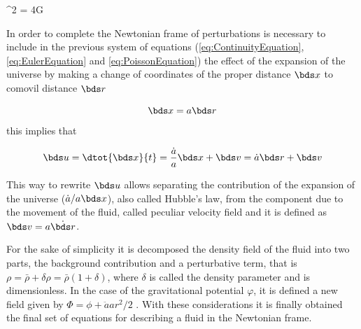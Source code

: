 { \nabla^2 \varphi = 4\pi G \rho }



In order to complete the Newtonian frame of perturbations is necessary to 
include in the previous system of equations (\ref{eq:ContinuityEquation}, 
\ref{eq:EulerEquation} and \ref{eq:PoissonEquation}) the effect of the 
expansion of the universe by making a change of coordinates of the proper
distance $\bds x$ to comovil distance $\bds r$



\[\bds x = a \bds r\]
this implies that



\[\bds u = \dtot{\bds x}{t} = 
\frac{\dot a}{a}\bds x + \bds v = \dot a \bds r + \bds v\]



This way to rewrite $\bds u$ allows separating the contribution of the 
expansion of the universe ($\dot a/a \bds x$), also called Hubble's law,
from the component due to the movement of the fluid, called peculiar 
velocity field and it is defined as $\bds v = a \dot{ \bds r}$.


	
For the sake of simplicity it is decomposed the density field of the fluid 
into two parts, the background contribution and a perturbative term, that 
is $\rho = \bar \rho + \delta\rho = \bar \rho( 1+ \delta )$, where $\delta$
is called the density parameter and is dimensionless. In the case of the 
gravitational potential $\varphi$, it is defined a new field given by 
$ \Phi = \phi + \ddot a a r^2/2$ \cite{longair2008}. With these 
considerations it is finally obtained the final set of equations for 
describing a fluid in the Newtonian frame.




